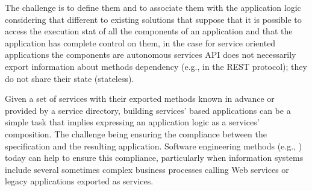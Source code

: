 The challenge is to define them and to associate them with the application logic considering that different to existing solutions that suppose that it is possible to access the execution stat of all the components  of an application and that the application has complete control on them, in the case for service oriented applications  the components are autonomous services
API does not necessarily export information about methods dependency (e.g., in the REST protocol);
they do not share their state (stateless).



Given a set of services with their exported methods known in advance or provided by a  service directory, building services' based applications can be  a simple task that implies expressing an application logic as a services' composition. The challenge being  ensuring the compliance between the specification and the resulting application. Software engineering methods (e.g., \cite{1,2,decastro1,PapazoglouH06}) today can help to ensure this compliance, particularly when information systems include several sometimes complex business processes calling Web services or legacy applications exported as services. 

